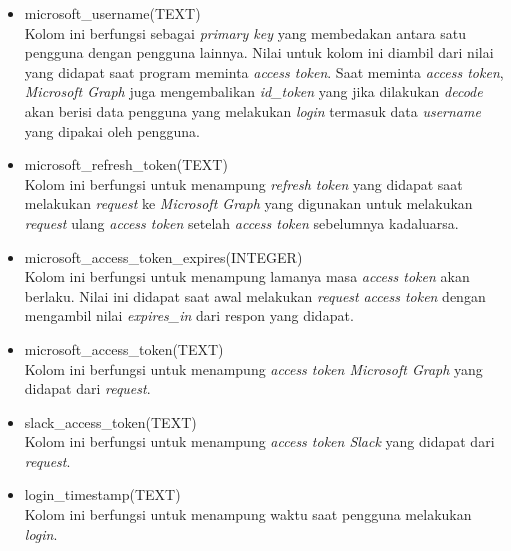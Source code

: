 \begin{itemize}
    \item microsoft\_username(TEXT)\\
    Kolom ini berfungsi sebagai \textit{primary key} yang membedakan antara satu pengguna dengan pengguna lainnya. Nilai untuk kolom ini diambil dari nilai yang didapat saat program meminta \textit{access token}. Saat meminta \textit{access token}, \textit{Microsoft Graph} juga mengembalikan \textit{id\_token} yang jika dilakukan \textit{decode} akan berisi data pengguna yang melakukan \textit{login} termasuk data \textit{username} yang dipakai oleh pengguna. 
    \item microsoft\_refresh\_token(TEXT)\\
    Kolom ini berfungsi untuk menampung \textit{refresh token} yang didapat saat melakukan \textit{request} ke \textit{Microsoft Graph} yang digunakan untuk melakukan \textit{request} ulang \textit{access token} setelah \textit{access token} sebelumnya kadaluarsa. 
    \item microsoft\_access\_token\_expires(INTEGER)\\
    Kolom ini berfungsi untuk menampung lamanya masa \textit{access token} akan berlaku. Nilai ini didapat saat awal melakukan \textit{request} \textit{access token} dengan mengambil nilai \textit{expires\_in} dari respon yang didapat. 
    \item microsoft\_access\_token(TEXT)\\
    Kolom ini berfungsi untuk menampung \textit{access token Microsoft Graph} yang didapat dari \textit{request}. 
    \item slack\_access\_token(TEXT)\\
    Kolom ini berfungsi untuk menampung \textit{access token Slack} yang didapat dari \textit{request}. 
    \item login\_timestamp(TEXT)\\
    Kolom ini berfungsi untuk menampung waktu saat pengguna melakukan \textit{login}. 
\end{itemize}


